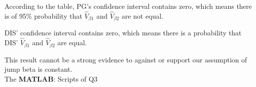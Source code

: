 \documentclass[12pt,letterpaper]{article}
\begin{document}
\begin{enumerate}[label=\textbf{(\Alph*)}]
According to the table, PG's confidence interval contains zero, which means there is of 95\% probability that $\hat{V}_{\beta1}$ and $\hat{V}_{\beta2}$ are not equal.

DIS' confidence interval contains zero, which means there is a probability that DIS' $\hat{V}_{\beta1}$ and $\hat{V}_{\beta2}$ are equal. 


This result cannot be a strong evidence to against or support our assumption of jump beta is constant.\\

	The \textbf{MATLAB}:
Scripts of Q3

\end{enumerate}
\end{document}
